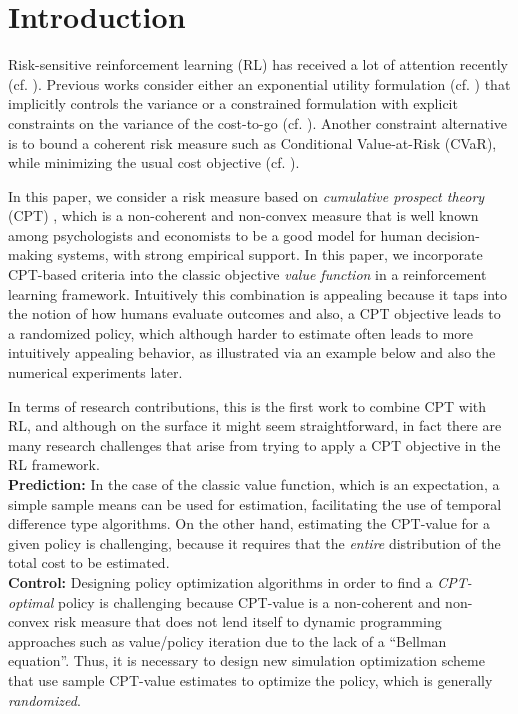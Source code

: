 \documentclass[11pt,letterpaper,english]{article}
\begin{document}



\section{Introduction}
\label{sec:introduction}
Risk-sensitive reinforcement learning (RL) has received a lot of attention recently (cf. \cite{borkar2010learning,borkar2010risk,tamar2012policy,Prashanth13AC}). Previous works consider either an exponential utility formulation (cf. \cite{borkar2010learning}) that implicitly controls the variance or a constrained formulation with explicit constraints on the variance of the cost-to-go (cf. \cite{tamar2012policy,Prashanth13AC}). Another constraint alternative is to bound a coherent risk measure such as Conditional Value-at-Risk (CVaR), while minimizing the usual cost objective (cf. \cite{borkar2010risk,prashanth2014policy}).  

In this paper, we consider a risk measure based on \textit{cumulative prospect theory} (CPT) \cite{tversky1992advances}, which is a non-coherent and non-convex measure that is well known among psychologists and economists to be a good model for human decision-making systems, with strong empirical support. In this paper, we incorporate CPT-based criteria into the classic objective \textit{value function} in a reinforcement learning framework. Intuitively this combination is appealing because it taps into the notion of how humans evaluate outcomes and also, a CPT objective leads to a randomized policy, which although harder to estimate often leads to more intuitively appealing behavior, as illustrated via an example below and also the numerical experiments later.

In terms of research contributions, this is the first work to combine CPT with RL, and although on the surface it might seem straightforward, in fact there are many research challenges that arise from trying to apply a CPT objective in the RL framework. \\
\textbf{Prediction:} In the case of the classic value function, which is an expectation, a simple sample means can be used for estimation, facilitating the use of temporal difference type algorithms. On the other hand, estimating the CPT-value for a given policy is challenging, because it requires that the \textit{entire} distribution of the total cost to be estimated.\\ 
\textbf{Control:} 
Designing policy optimization algorithms in order to find a \textit{CPT-optimal} policy is challenging because CPT-value is a non-coherent and non-convex risk measure that does not lend itself to dynamic programming approaches such as value/policy iteration due to the lack of a ``Bellman equation''. Thus, it is necessary to design new simulation optimization scheme that use sample CPT-value estimates to optimize the policy, which is generally \textit{randomized}. 
\end{document}
